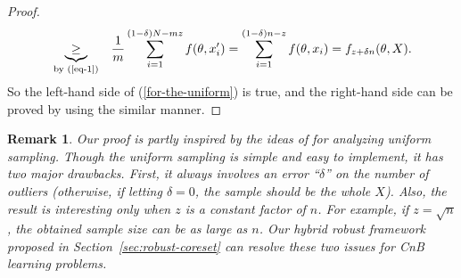 \documentclass{article}
\newtheorem{remark}[lemma]{Remark}
\begin{document}
\begin{proof}
\begin{eqnarray}
	&\underbrace{\geq}_{\text{by (\ref{eq-1})}} &\frac{1}{m}\sum_{i=1}^{(1-\delta)N-mz}f(\theta,x'_i)=\sum_{i=1}^{(1-\delta)n-z}f(\theta,x_i)=f_{z+\delta n}(\theta,X).
\end{eqnarray}
So the left-hand side of (\ref{for-the-uniform}) is true, and the right-hand side can be proved by using the similar manner. 
%
%
%
%
%
\end{proof}


\begin{remark}
Our  proof is partly inspired by the ideas of \cite{MountNPSW14,DBLP:journals/ml/MeyersonOP04} for analyzing uniform sampling. 
Though the uniform sampling is simple and easy to implement, it has two major drawbacks. First, it always involves an error ``$\delta$'' on the number of outliers (otherwise, if letting $\delta=0$, the sample should be the whole $X$). Also, the result is interesting only when $z$ is a constant factor of $n$. For example, if $z=\sqrt{n}$, the obtained sample size can be as large as $n$. Our hybrid robust framework proposed in Section~\ref{sec:robust-coreset} can resolve these two issues for CnB learning problems. 
\end{remark}
\end{document}
